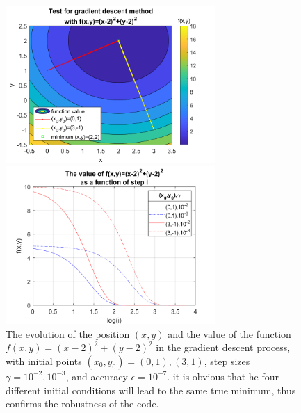 \documentclass[12pt, graphicx]{article}
\begin{document}
\begin{figure}[ht]
\begin{minipage}{0.48\linewidth}
\centering
\includegraphics[width = 80mm]{grad_test.png}
\end{minipage}
\begin{minipage}{0.48\linewidth}
\centering
\includegraphics[width = 80mm]{test_value.png}
\end{minipage}
\caption{The evolution of the position $(x,y)$ and the value of the function $f(x,y)=(x-2)^2+(y-2)^2$ in the gradient descent process, with initial points $(x_0,y_0)=(0,1), (3,1)$, step sizes $\gamma=10^{-2},10^{-3}$, and accuracy $\epsilon=10^{-7}$. it is obvious that he four different initial conditions will lead to the same true minimum, thus confirms the robustness of the code.}
\label{fig:test}
\end{figure}
\end{document}
